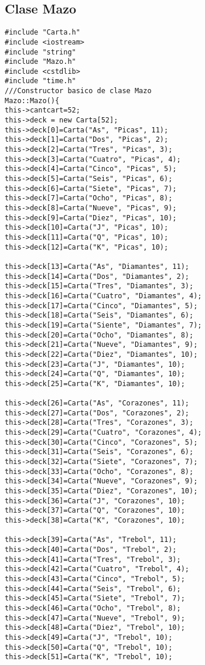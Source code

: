 \documentclass[11pt]{article}
\begin{document}
\subsection{Clase Mazo}
\begin{lstlisting}
#include "Carta.h"
#include <iostream>
#include "string"
#include "Mazo.h"
#include <cstdlib>
#include "time.h"
///Constructor basico de clase Mazo
Mazo::Mazo(){
this->cantcart=52;
this->deck = new Carta[52];
this->deck[0]=Carta("As", "Picas", 11);
this->deck[1]=Carta("Dos", "Picas", 2);
this->deck[2]=Carta("Tres", "Picas", 3);
this->deck[3]=Carta("Cuatro", "Picas", 4);
this->deck[4]=Carta("Cinco", "Picas", 5);
this->deck[5]=Carta("Seis", "Picas", 6);
this->deck[6]=Carta("Siete", "Picas", 7);
this->deck[7]=Carta("Ocho", "Picas", 8);
this->deck[8]=Carta("Nueve", "Picas", 9);
this->deck[9]=Carta("Diez", "Picas", 10);
this->deck[10]=Carta("J", "Picas", 10);
this->deck[11]=Carta("Q", "Picas", 10);
this->deck[12]=Carta("K", "Picas", 10);

this->deck[13]=Carta("As", "Diamantes", 11);
this->deck[14]=Carta("Dos", "Diamantes", 2);
this->deck[15]=Carta("Tres", "Diamantes", 3);
this->deck[16]=Carta("Cuatro", "Diamantes", 4);
this->deck[17]=Carta("Cinco", "Diamantes", 5);
this->deck[18]=Carta("Seis", "Diamantes", 6);
this->deck[19]=Carta("Siente", "Diamantes", 7);
this->deck[20]=Carta("Ocho", "Diamantes", 8);
this->deck[21]=Carta("Nueve", "Diamantes", 9);
this->deck[22]=Carta("Diez", "Diamantes", 10);
this->deck[23]=Carta("J", "Diamantes", 10);
this->deck[24]=Carta("Q", "Diamantes", 10);
this->deck[25]=Carta("K", "Diamantes", 10);

this->deck[26]=Carta("As", "Corazones", 11);
this->deck[27]=Carta("Dos", "Corazones", 2);
this->deck[28]=Carta("Tres", "Corazones", 3);
this->deck[29]=Carta("Cuatro", "Corazones", 4);
this->deck[30]=Carta("Cinco", "Corazones", 5);
this->deck[31]=Carta("Seis", "Corazones", 6);
this->deck[32]=Carta("Siete", "Corazones", 7);
this->deck[33]=Carta("Ocho", "Corazones", 8);
this->deck[34]=Carta("Nueve", "Corazones", 9);
this->deck[35]=Carta("Diez", "Corazones", 10);
this->deck[36]=Carta("J", "Corazones", 10);
this->deck[37]=Carta("Q", "Corazones", 10);
this->deck[38]=Carta("K", "Corazones", 10);

this->deck[39]=Carta("As", "Trebol", 11);
this->deck[40]=Carta("Dos", "Trebol", 2);
this->deck[41]=Carta("Tres", "Trebol", 3);
this->deck[42]=Carta("Cuatro", "Trebol", 4);
this->deck[43]=Carta("Cinco", "Trebol", 5);
this->deck[44]=Carta("Seis", "Trebol", 6);
this->deck[45]=Carta("Siete", "Trebol", 7);
this->deck[46]=Carta("Ocho", "Trebol", 8);
this->deck[47]=Carta("Nueve", "Trebol", 9);
this->deck[48]=Carta("Diez", "Trebol", 10);
this->deck[49]=Carta("J", "Trebol", 10);
this->deck[50]=Carta("Q", "Trebol", 10);
this->deck[51]=Carta("K", "Trebol", 10);


\end{lstlisting}
\end{document}
